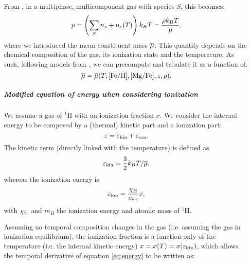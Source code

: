From \citep[p. 161]{Vandenbroucke2016}, in a multiphase, multicomponent gas with species $S$, this becomes:
\begin{equation}
p = \left(\sum_S n_s + n_e(T)\right) k_BT =\frac{\rho k_B T}{\overline{\mu}},
\end{equation}
where we introduced the mean constituent mass $\overline{\mu}$.
This quantity depends on the chemical composition of the gas, its ionization state and the temperature.
As such, following models from \citet{DeRijcke2013}, we can precompute and tabulate it as a function of:
\[\overline{\mu} = \overline{\mu}(T, [\text{Fe}/\text{H}], [\text{Mg}/\text{Fe}], z, \rho).\]

\subparagraph{Modified equation of energy when considering ionization}
We assume a gas of ${}^1$H with an ionization fraction $x$.
We consider the internal energy to be composed by a (thermal) kinetic part and a ionization part:
\begin{equation}
\label{eq:energy}
\varepsilon = \varepsilon_\text{kin} + \varepsilon_\text{ion}.
\end{equation}
The kinetic term (directly linked with the temperature) is defined as
\begin{equation}
\varepsilon_\text{kin} = \frac 3 2 k_B T/ \overline{\mu},
\end{equation}
whereas the ionization energy is
\begin{equation}
\label{eq:energy_ion}
\varepsilon_\text{ion} = \dfrac{\chi_\text H}{m_\text H} x,
\end{equation}
with $\chi_\text H$ and $m_H$ the ionization energy and atomic mass of ${}^1$H.

Assuming no temporal composition changes in the gas (i.e. assuming the gas in ionization equilibrium), the ionization fraction is a function only of the temperature (i.e. the internal kinetic energy) $x = x(T) = x(\varepsilon_\text{kin})$, which allows the temporal derivative of equation \eqref{eq:energy} to be written as:

